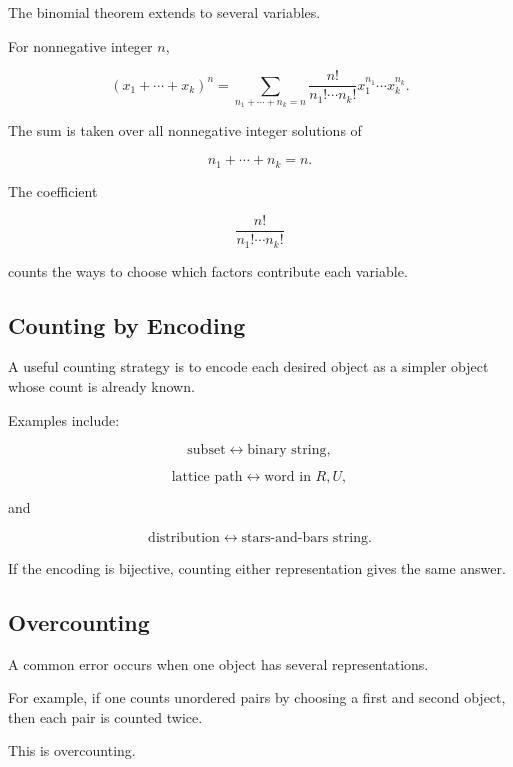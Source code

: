 The binomial theorem extends to several variables.

\begin{theorem}
For nonnegative integer \(n\),

\[
\boxed{
(x_1+\cdots+x_k)^n
=
\sum_{n_1+\cdots+n_k=n}
\frac{n!}{n_1!\cdots n_k!}
x_1^{n_1}\cdots x_k^{n_k}.
}
\]
\end{theorem}

The sum is taken over all nonnegative integer solutions of

\[
n_1+\cdots+n_k=n.
\]

The coefficient

\[
\frac{n!}{n_1!\cdots n_k!}
\]

counts the ways to choose which factors contribute each variable.

\subsection{Counting by Encoding}
\label{subsec:counting-by-encoding}

A useful counting strategy is to encode each desired object as a simpler
object whose count is already known.

Examples include:

\[
\text{subset}
\longleftrightarrow
\text{binary string},
\]

\[
\text{lattice path}
\longleftrightarrow
\text{word in }R,U,
\]

and

\[
\text{distribution}
\longleftrightarrow
\text{stars-and-bars string}.
\]

If the encoding is bijective, counting either representation gives the
same answer.

\subsection{Overcounting}
\label{subsec:overcounting}

A common error occurs when one object has several representations.

For example, if one counts unordered pairs by choosing a first and
second object, then each pair is counted twice.

This is overcounting.

